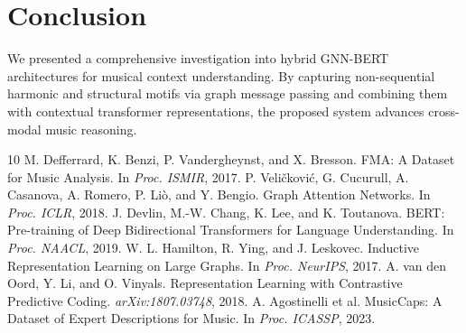 \documentclass{article}
\begin{document}
\section{Conclusion}
We presented a comprehensive investigation into hybrid GNN-BERT architectures for musical context understanding. By capturing non-sequential harmonic and structural motifs via graph message passing and combining them with contextual transformer representations, the proposed system advances cross-modal music reasoning.

\begin{thebibliography}{10}
 M. Defferrard, K. Benzi, P. Vandergheynst, and X. Bresson. FMA: A Dataset for Music Analysis. In \textit{Proc. ISMIR}, 2017.
 P. Veli\v{c}kovi\'c, G. Cucurull, A. Casanova, A. Romero, P. Li\`o, and Y. Bengio. Graph Attention Networks. In \textit{Proc. ICLR}, 2018.
 J. Devlin, M.-W. Chang, K. Lee, and K. Toutanova. BERT: Pre-training of Deep Bidirectional Transformers for Language Understanding. In \textit{Proc. NAACL}, 2019.
 W. L. Hamilton, R. Ying, and J. Leskovec. Inductive Representation Learning on Large Graphs. In \textit{Proc. NeurIPS}, 2017.
 A. van den Oord, Y. Li, and O. Vinyals. Representation Learning with Contrastive Predictive Coding. \textit{arXiv:1807.03748}, 2018.
 A. Agostinelli et al. MusicCaps: A Dataset of Expert Descriptions for Music. In \textit{Proc. ICASSP}, 2023.
\end{thebibliography}
\end{document}

